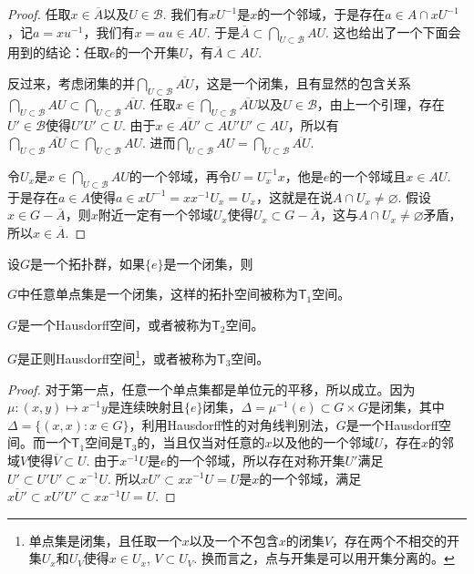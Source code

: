 \begin{proof}
	任取$x\in \overline{A}$以及$U\in \mathscr{B}$. 我们有$xU^{-1}$是$x$的一个邻域，于是存在$a\in A\cap x U^{-1}$，记$a=xu^{-1}$，我们有$x=au\in AU$. 于是$\overline{A}\subset \bigcap_{U\subset \mathscr{B}}AU$. 这也给出了一个下面会用到的结论：任取$e$的一个开集$U$，有$\overline{A}\subset AU$.

	反过来，考虑闭集的并$\bigcap_{U\subset \mathscr{B}}\overline{AU}$，这是一个闭集，且有显然的包含关系$\bigcap_{U\subset \mathscr{B}}AU\subset \bigcap_{U\subset \mathscr{B}}\overline{AU}$. 任取$x\in \bigcap_{U\subset \mathscr{B}}\overline{AU}$以及$U\in \mathscr{B}$，由上一个引理，存在$U'\in \mathscr{B}$使得$U'U'\subset U$. 由于$x\in \overline{AU'}\subset AU'U'\subset AU$，所以有$\bigcap_{U\subset \mathscr{B}}\overline{AU}\subset \bigcap_{U\subset \mathscr{B}}AU$. 进而$\bigcap_{U\subset \mathscr{B}}AU=\bigcap_{U\subset \mathscr{B}}\overline{AU}$.

	令$U_x$是$x\in \bigcap_{U\subset \mathscr{B}}AU$的一个邻域，再令$U=U_x^{-1}x$，他是$e$的一个邻域且$x\in AU$. 于是存在$a\in A$使得$a\in xU^{-1}=xx^{-1}U_x=U_x$，这就是在说$A\cap U_x\neq \varnothing$. 假设$x\in G-\overline{A}$，则$x$附近一定有一个邻域$U_x$使得$U_x\subset G-\overline{A}$，这与$A\cap U_x\neq \varnothing$矛盾，所以$x\in \overline{A}$.
\end{proof}

\begin{pro}\label{pro:3}
设$G$是一个拓扑群，如果$\{e\}$是一个闭集，则

\begin{compactenum}
\item $G$中任意单点集是一个闭集，这样的拓扑空间被称为$\mathsf{T}_1$空间。

\item $G$是一个Hausdorff空间，或者被称为$\mathsf{T}_2$空间。

\item $G$是正则Hausdorff空间\footnote{单点集是闭集，且任取一个$x$以及一个不包含$x$的闭集$V$，存在两个不相交的开集$U_x$和$U_V$使得$x\in U_x$, $V\subset U_V$. 换而言之，点与开集是可以用开集分离的。}，或者被称为$\mathsf{T}_3$空间。
\end{compactenum}
\end{pro}

\begin{proof}
	对于第一点，任意一个单点集都是单位元的平移，所以成立。因为$\mu:(x,y)\mapsto x^{-1}y$是连续映射且$\{e\}$闭集，$\Delta=\mu^{-1}(e)\subset G\times G$是闭集，其中$\Delta=\{(x,x):x\in G\}$，利用Hausdorff性的对角线判别法，$G$是一个Hausdorff空间。而一个$\mathsf{T}_1$空间是$\mathsf{T}_3$的，当且仅当对任意的$x$以及他的一个邻域$U$，存在$x$的邻域$V$使得$\overline{V}\subset U$. 由于$x^{-1}U$是$e$的一个邻域，所以存在对称开集$U'$满足$U'\subset U'U'\subset x^{-1}U$. 所以$xU'\subset xx^{-1}U=U$是$x$的一个邻域，满足$\overline{xU'}\subset xU'U'\subset xx^{-1}U=U$.
\end{proof}

